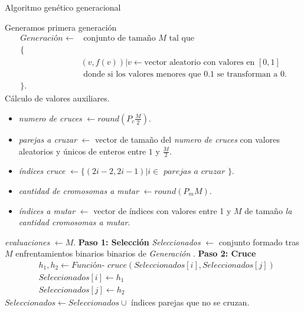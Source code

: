 \begin{algorithm}[H]
    \caption{Algoritmo genético generacional}

    \begin{algorithmic}[1]
        \State Generamos primera generación \\
        \begin{align*}
            \textit{Generación }\gets & \text{ conjunto de tamaño $M$ tal que } \\
            \{ \quad  & \\
                &(v, f(v)) | v \gets \text{vector  aleatorio con valores en } [0,1] \\ 
                & \text{ donde si  los valores menores que } 0.1 \text{ se transforman a } 0. \\
            \}. \quad &
        \end{align*}
        \State Cálculo de valores auxiliares.
        \begin{itemize}
            \item \textit{numero de cruces}  $\gets round\left(P_c \frac{M}{2}\right).$
            \item \textit{parejas a cruzar} $\gets$ vector de tamaño del \textit{numero de cruces} con valores aleatorios y únicos de enteros entre $1$ y $\frac{M}{2}$.
            \item \textit{índices cruce } $\gets \{ (2 i-2, 2 i -1 ) | i \in \textit{ parejas a cruzar } \}$. 
            \item \textit{cantidad de cromosomas a mutar }  $\gets round(P_m M)$.
            \item \textit{ índices a mutar } $\gets$ vector de índices con valores entre 1 y $M$ de tamaño \textit{ la cantidad cromosomas a mutar}. 
        \end{itemize}

        \textit{evaluaciones} $\gets M$.
            \State \textbf{Paso 1: Selección}
            \State \textit{Seleccionados} $\gets$ conjunto formado tras $M$ enfrentamientos binarios binarios de \textit{Generación }. 
            \State \textbf{Paso 2: Cruce }
            \begin{align*}
                & h_1, h_2 \gets \textit{Función- cruce}(Seleccionados[i], Seleccionados[j]) \\
                & Seleccionados[i] \gets h_1 \\
                & Seleccionados[j] \gets h_2 
            \end{align*}
            \EndFor
            \State $Seleccionados \gets Seleccionados \cup$ índices parejas que no se cruzan. 


\end{algorithmic}
\end{algorithm}
